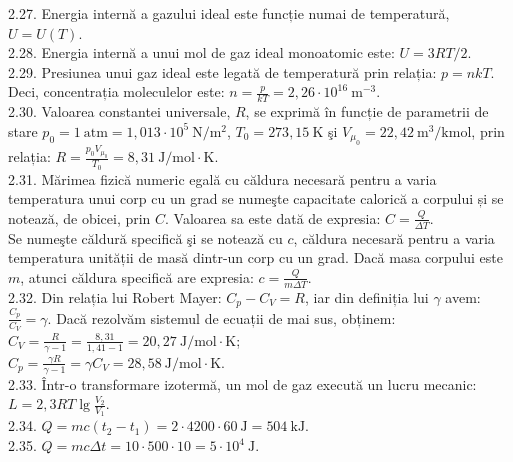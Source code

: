 2.27. Energia internă a gazului ideal este funcție numai de temperatură, $U=U(T)$.\\

2.28. Energia internă a unui mol de gaz ideal monoatomic este: $U=3 R T / 2$.\\

2.29. Presiunea unui gaz ideal este legată de temperatură prin relația: $p=n k T$. Deci, concentrația moleculelor este: $n=\frac{p}{k T}=2,26 \cdot 10^{16} \mathrm{~m}^{-3}$.\\

2.30. Valoarea constantei universale, $R$, se exprimă în funcție de parametrii de stare $p_{0}=1 \mathrm{~atm}=1,013 \cdot 10^{5} \mathrm{~N} / \mathrm{m}^{2}$, $T_{0}=273,15 \mathrm{~K}$ şi $V_{\mu_{0}}=22,42 \mathrm{~m}^{3} / \mathrm{kmol}$, prin relația: $R=\frac{p_{0} V_{\mu_{0}}}{T_{0}}=8,31 \mathrm{~J} / \mathrm{mol} \cdot \mathrm{K}$.\\

2.31. Mărimea fizică numeric egală cu căldura necesară pentru a varia temperatura unui corp cu un grad se numeşte capacitate calorică a corpului și se notează, de obicei, prin $C$. Valoarea sa este dată de expresia: $C=\frac{Q}{\Delta T}$.\\ Se numeşte căldură specifică şi se notează cu $c$, căldura necesară pentru a varia temperatura unității de masă dintr-un corp cu un grad. Dacă masa corpului este $m$, atunci căldura specifică are expresia: $c=\frac{Q}{m \Delta T}$.\\

2.32. Din relația lui Robert Mayer: $C_{p}-C_{V}=R$, iar din definiția lui $\gamma$ avem: $\frac{C_{p}}{C_{V}}=\gamma$. Dacă rezolvăm sistemul de ecuații de mai sus, obținem:\\ $C_{V}=\frac{R}{\gamma-1}=\frac{8,31}{1,41-1}=20,27 \mathrm{~J} / \mathrm{mol} \cdot \mathrm{K}$;\\ $C_{p}=\frac{\gamma R}{\gamma-1}=\gamma C_{V}=28,58 \mathrm{~J} / \mathrm{mol} \cdot \mathrm{K}$.\\

2.33. Într-o transformare izotermă, un mol de gaz execută un lucru mecanic:\\ $L=2,3 R T \lg \frac{V_{2}}{V_{1}}$.\\

2.34. $Q=m c\left(t_{2}-t_{1}\right)=2 \cdot 4200 \cdot 60 \mathrm{~J}=504 \mathrm{~kJ}$.\\

2.35. $Q=m c \Delta t=10 \cdot 500 \cdot 10=5 \cdot 10^{4} \mathrm{~J}$.\\

